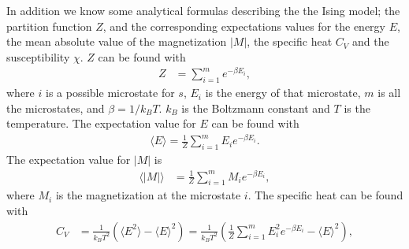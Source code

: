 \documentclass[a4paper]{article}
\begin{document}
In addition we know some analytical formulas describing the the Ising model; the partition function $Z$, and the corresponding expectations values for the energy $E$, the mean absolute value of the magnetization $|M|$, the specific heat $C_V$ and the susceptibility $\chi$. $Z$ can be found with
\begin{align}
Z &= \sum_{i=1}^{m} e^{-\beta E_i},
\end{align}
where $i$ is a possible microstate for $s$, $E_i$ is the energy of that microstate, $m$ is all the microstates, and $\beta = 1/k_BT$. $k_B$ is the Boltzmann constant and $T$ is the temperature. The expectation value for $E$ can be found with
\begin{align}
\langle E \rangle = \frac{1}{Z} \sum_{i=1}^{m} E_i e^{-\beta E_i}.
\end{align}
The expectation value for $|M|$ is
\begin{align}
\langle |M| \rangle &= \frac{1}{Z} \sum_{i=1}^{m} M_i e^{-\beta E_i},
\end{align}
where $M_i$ is the magnetization at the microstate $i$. The specific heat can be found with
\begin{align}
C_V &= \frac{1}{k_BT^2} \left( \langle E^2 \rangle - \langle E \rangle ^2 \right)
= \frac{1}{k_BT^2} \left( \frac{1}{Z} \sum_{i=1}^{m} E_i^2 e^{-\beta E_i} - \langle E \rangle ^2 \right),
\end{align}
\end{document}
